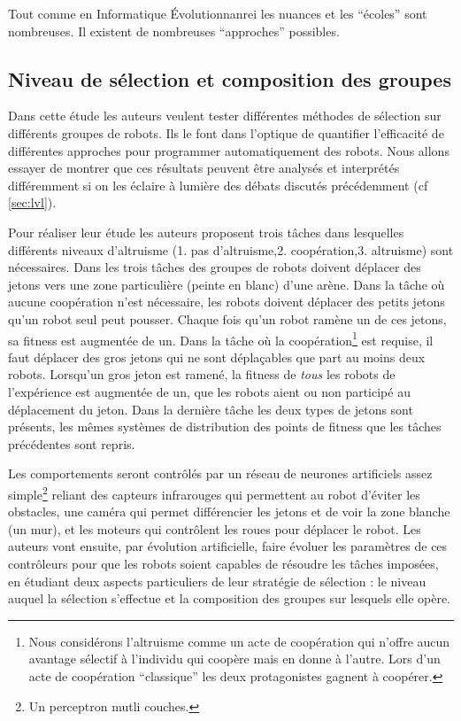 Tout comme en Informatique Évolutionnanrei les nuances et les ``écoles'' sont nombreuses. Il existent de nombreuses ``approches'' possibles.%
\subsection{Niveau de sélection et composition des groupes \citep{waibel09geneticteamcompositionlevelselectionevolutioncooperation}}\label{sec:nscg}

Dans cette étude les auteurs veulent tester différentes méthodes de sélection sur différents groupes de robots. Ils le font dans l'optique de quantifier l'efficacité de différentes approches pour programmer automatiquement des robots. Nous allons essayer de montrer que ces résultats peuvent être analysés et interprétés différemment si on les éclaire à lumière des débats discutés précédemment (cf \ref{sec:lvl}).

Pour réaliser leur étude les auteurs proposent trois tâches dans lesquelles différents niveaux d'altruisme (1. pas d'altruisme,2. coopération,3.  altruisme) sont nécessaires.
Dans les trois tâches des groupes de robots doivent déplacer des jetons vers une zone particulière (peinte en blanc) d'une arène. Dans la tâche où aucune coopération n'est nécessaire, les robots doivent déplacer des petits jetons qu'un robot seul peut pousser. Chaque fois qu'un robot ramène un de ces jetons, sa fitness est augmentée de un. Dans la tâche où la coopération\footnote{Nous considérons l'altruisme comme un acte de coopération qui n'offre aucun avantage sélectif à l'individu qui coopère mais en donne à l'autre. Lors d'un acte de coopération ``classique'' les deux protagonistes gagnent à coopérer.} est requise, il faut déplacer des gros jetons qui ne sont déplaçables que part au moins deux robots. Lorsqu'un gros jeton est ramené, la fitness de \emph{tous} les robots de l'expérience est augmentée de un, que les robots aient ou non participé au déplacement du jeton. Dans la dernière tâche les deux types de jetons sont présents, les mêmes systèmes de distribution des points de fitness que les tâches précédentes sont repris.

Les comportements seront contrôlés par un réseau de neurones artificiels assez simple\footnote{Un perceptron mutli couches.} reliant des capteurs infrarouges qui permettent au robot d'éviter les obstacles, une caméra qui permet différencier les jetons et de voir la zone blanche (un mur), et les moteurs qui contrôlent les roues pour déplacer le robot.
Les auteurs vont ensuite, par évolution artificielle, faire évoluer les paramètres de ces contrôleurs pour que les robots soient capables de résoudre les tâches imposées, en étudiant deux aspects particuliers de leur stratégie de sélection : le niveau auquel la sélection s'effectue et la composition des groupes sur lesquels elle opère. 

